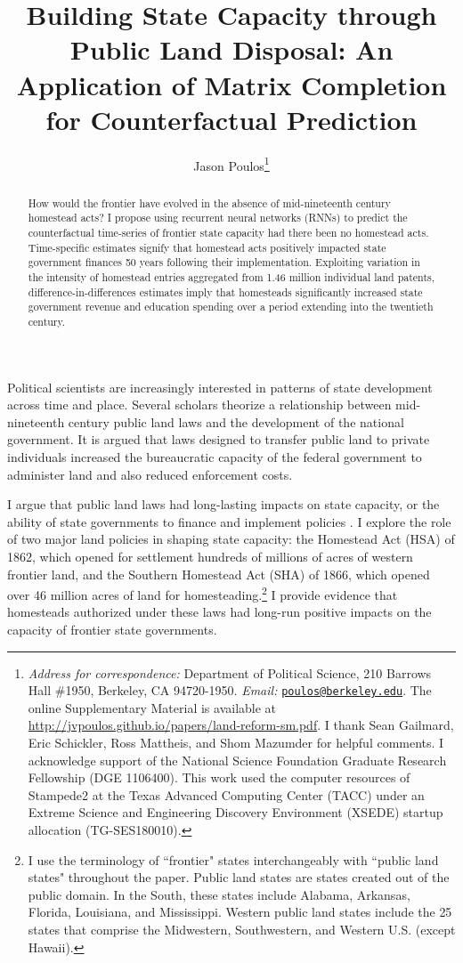 \documentclass[12pt]{article}
\title{Building State Capacity through Public Land Disposal: An Application of Matrix Completion for Counterfactual Prediction}
\author[ ]{Jason Poulos\thanks{\emph{Address for correspondence:} Department of Political Science, 210 Barrows Hall \#1950, Berkeley, CA 94720-1950. \emph{Email:} \href{mailto:poulos@berkeley.edu}{\nolinkurl{poulos@berkeley.edu}}. The online Supplementary Material is available at \url{http://jvpoulos.github.io/papers/land-reform-sm.pdf}. I thank Sean Gailmard, Eric Schickler, Ross Mattheis, and Shom Mazumder for helpful comments. I acknowledge support of the National Science Foundation Graduate Research Fellowship (DGE 1106400). This work used the computer resources of Stampede2 at the Texas Advanced Computing Center (TACC) under an Extreme Science and Engineering Discovery Environment (XSEDE) startup allocation (TG-SES180010).}}
\affil[ ]{University of California, Berkeley}
\date{}
\begin{document}
 
 
\begin{singlespacing}
\maketitle  
\end{singlespacing}

\thispagestyle{empty}

\begin{abstract}  
\noindent
How would the frontier have evolved in the absence of mid-nineteenth century homestead acts? I propose using recurrent neural networks (RNNs) to predict the counterfactual time-series of frontier state capacity had there been no homestead acts. Time-specific estimates signify that homestead acts positively impacted state government finances 50 years following their implementation. Exploiting variation in the intensity of homestead entries aggregated from 1.46 million individual land patents, difference-in-differences estimates imply that homesteads significantly increased state government revenue and education spending over a period extending into the twentieth century.\\
\end{abstract}	

\pagebreak
{}%

Political scientists are increasingly interested in patterns of state development across time and place. Several scholars \citep[e.g.,][]{bensel1990,murtazashvili2013political,frymer2014rush} theorize a relationship between mid-nineteenth century public land laws and the development of the national government. It is argued that laws designed to transfer public land to private individuals increased the bureaucratic capacity of the federal government to administer land and also reduced enforcement costs. 

I argue that public land laws had long-lasting impacts on state capacity, or the ability of state governments to finance and implement policies \citep{besley2010state}. I explore the role of two major land policies in shaping state capacity: the Homestead Act (HSA) of 1862, which opened for settlement hundreds of millions of acres of western frontier land, and the Southern Homestead Act (SHA) of 1866, which opened over 46 million acres of land for homesteading.\footnote{I use the terminology of ``frontier" states interchangeably with ``public land states" throughout the paper. Public land states are states created out of the public domain. In the South, these states include Alabama, Arkansas, Florida, Louisiana, and Mississippi. Western public land states include the 25 states that comprise the Midwestern, Southwestern, and Western U.S. (except Hawaii).} I provide evidence that homesteads authorized under these laws had long-run positive impacts on the capacity of frontier state governments. 
\end{document}
